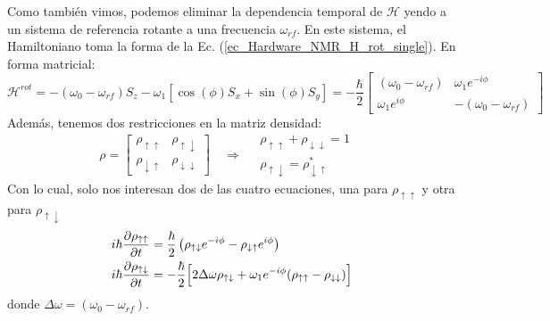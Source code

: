 \documentclass[a4paper,11pt]{book} %
\numberwithin{equation}{chapter}
\def\lp{\left(}
\def\rp{\right)}
\def\lc{\left[}
\def\rc{\right]}
\def\Lc{\Bigl[}
\def\Rc{\Bigr]}
\def\rqa{\quad \Rightarrow \quad}
\begin{document}
Como también vimos, podemos eliminar la dependencia temporal de $\mathcal{H}$ yendo a un sistema de referencia rotante a una frecuencia $\omega_{rf}$. En este sistema, el Hamiltoniano toma la forma de la Ec. (\ref{ec_Hardware_NMR_H_rot_single}). En forma matricial:
	\begin{equation}
	\mathcal{H}^{rot} = - (\omega_0 - \omega_{rf}) S_z - \omega_1 \lc \cos (\phi) S_x + \sin (\phi) S_y \rc = 
	- \frac{\hbar}{2} \begin{bmatrix}
	(\omega_0 - \omega_{rf})  &  \omega_1 e^{-i \phi} \\
	\omega_1 e^{i \phi}          &  - (\omega_0 - \omega_{rf}) 
	\end{bmatrix}
	\end{equation}
Además, tenemos dos restricciones en la matriz densidad: 
	\begin{equation*}
	\rho = 
	\begin{bmatrix} 
		\rho_{\uparrow \uparrow} & \rho_{\uparrow \downarrow} \\   
		\rho_{\downarrow \uparrow} & \rho_{\downarrow \downarrow}
	\end{bmatrix} 
	\rqa
	\begin{matrix}
		\rho_{\uparrow \uparrow} + \rho_{\downarrow \downarrow}  = 1 &\\
		\rho_{\uparrow \downarrow}  = \rho^{*}_{\downarrow \uparrow} &
	\end{matrix}
	\end{equation*}
Con lo cual, solo nos interesan dos de las cuatro ecuaciones, una para $\rho_{\uparrow \uparrow}$ y otra para $\rho_{\uparrow \downarrow}$
	\begin{equation} \label{ec_decoherencia_rho_up-up_up-down} 
	\begin{aligned}
	i \hbar \frac{\partial \rho_{\uparrow \uparrow}}{\partial t} & = \frac{\hbar}{2} \lp \rho_{\uparrow \downarrow} e^{-i \phi} - \rho_{\downarrow \uparrow} e^{i \phi} \rp \\
	i \hbar \frac{\partial \rho_{\uparrow \downarrow}}{\partial t} & = 
	- \frac{\hbar}{2} \Lc 2 \Delta \omega \rho_{\uparrow \downarrow} + 
	\omega_1 e^{-i \phi} (\rho_{\uparrow \uparrow} - \rho_{\downarrow \downarrow}) \Rc 
	\end{aligned}
	\end{equation}
donde $\Delta \omega = (\omega_0 - \omega_{rf})$.
\end{document}
